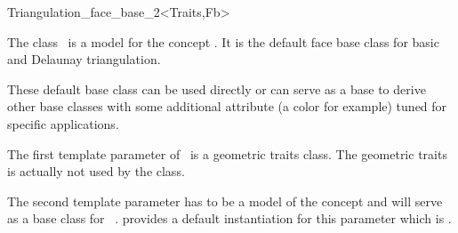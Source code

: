 

\begin{ccRefClass}{Triangulation_face_base_2<Traits,Fb>}  %

\ccDefinition
  
The class \ccRefName\ is a model for the concept
. It is the default face base class
for basic and Delaunay triangulation.

These default base class can be used directly or can serve as a base to derive
other base classes with some additional attribute (a color for example)
tuned for specific applications.


\ccParameters
The first template parameter of \ccRefName\ is  a geometric traits class.
The geometric traits is actually not used by the class.

The second template parameter 
has to be a  model of the concept 
and will serve as a base class for \ccRefName\ .
\cgal provides a default instantiation for this parameter which is
.



\ccIsModel
{}

\ccSeeAlso
{}\\
\\



\end{ccRefClass}


